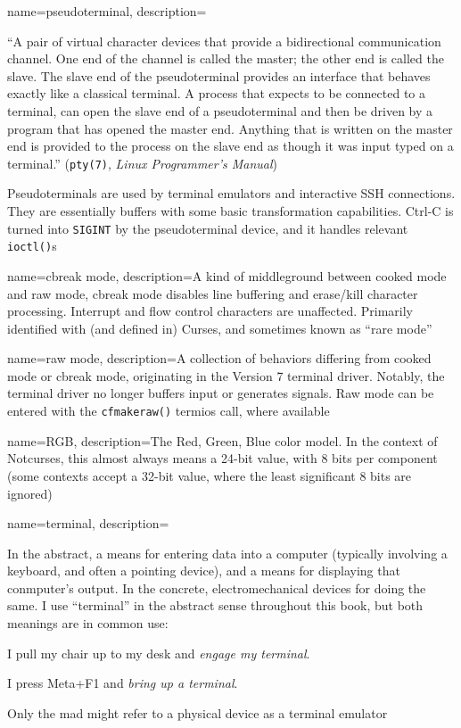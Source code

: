 {
  name={pseudoterminal},
description={``A pair of virtual character devices that provide a
  bidirectional communication channel. One end of the channel is called the
  master; the other end is called the slave. The slave end of the
  pseudoterminal provides an interface that behaves exactly like a classical
  terminal. A process that expects to be connected to a terminal, can open
  the slave end of a pseudoterminal and then be driven by a program that has
  opened the master end. Anything that is written on the master end is
  provided to the process on the slave end as though it was input typed on a
  terminal.'' (\texttt{pty(7)}, \textit{Linux Programmer's Manual}\cite{pty7})

 Pseudoterminals are used by terminal emulators and interactive SSH
  connections. They are essentially buffers with some basic transformation
  capabilities. Ctrl-C is turned into \texttt{SIGINT} by the pseudoterminal device,
  and it handles relevant \texttt{ioctl()}s}
}

{
  name={cbreak mode},
  description={A kind of middleground between \gls{cooked mode} and \gls{raw mode},
    cbreak mode disables line buffering and erase/kill character processing.
    Interrupt and flow control characters are unaffected. Primarily identified
    with (and defined in) Curses\cite{cursesosi}, and sometimes known as ``rare mode''}
}

{
  name={raw mode},
  description={A collection of behaviors differing from \gls{cooked mode} or
    \gls{cbreak mode},
   originating in the Version 7 terminal driver. Notably, the terminal driver no
   longer buffers input or generates signals. Raw mode can be entered with the
   \texttt{cfmakeraw()} termios call, where available}
}

{
  name={RGB},
  description={The Red, Green, Blue color model. In the context of Notcurses,
    this almost always means a 24-bit value, with 8 bits per component (some
    contexts accept a 32-bit value, where the least significant 8 bits are
    ignored)}
}

{
  name={terminal},
description={In the abstract, a means for entering data into a computer
  (typically involving a keyboard, and often a pointing device), and a means
  for displaying that conmputer's output. In the concrete, electromechanical
  devices for doing the same. I use ``terminal'' in the abstract sense
  throughout this book, but both meanings are in common use:

  \begin{denseitemize}
  \item I pull my chair up to my desk and \textit{engage my terminal}.
  \item I press Meta+F1 and \textit{bring up a terminal}.
  \end{denseitemize}

 Only the mad might refer to a physical device as a terminal emulator}
}

